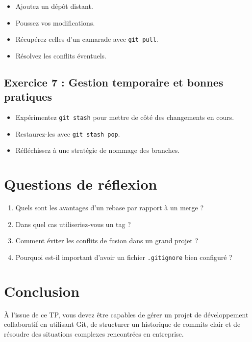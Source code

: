 \documentclass[a4paper,12pt]{article}
\begin{document}
\begin{itemize}
    \item Ajoutez un dépôt distant.
    \item Poussez vos modifications.
    \item Récupérez celles d’un camarade avec \texttt{git pull}.
    \item Résolvez les conflits éventuels.
\end{itemize}

\subsection*{Exercice 7 : Gestion temporaire et bonnes pratiques}

\begin{itemize}
    \item Expérimentez \texttt{git stash} pour mettre de côté des changements en cours.
    \item Restaurez-les avec \texttt{git stash pop}.
    \item Réfléchissez à une stratégie de nommage des branches.
\end{itemize}

\section*{Questions de réflexion}

\begin{enumerate}
    \item Quels sont les avantages d’un rebase par rapport à un merge ?
    \item Dans quel cas utiliseriez-vous un tag ?
    \item Comment éviter les conflits de fusion dans un grand projet ?
    \item Pourquoi est-il important d’avoir un fichier \texttt{.gitignore} bien configuré ?
\end{enumerate}

\section*{Conclusion}

À l’issue de ce TP, vous devez être capables de gérer un projet de développement collaboratif en utilisant Git, de structurer un historique de commits clair et de résoudre des situations complexes rencontrées en entreprise.
\end{document}
